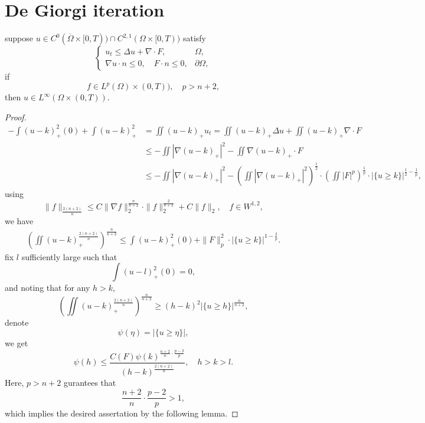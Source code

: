 \section{De Giorgi iteration}

\begin{lemma}
	suppose $u\in C^0(\overline{\Omega}\times[0,T))\cap C^{2,1}(\Omega\times[0,T))$ satisfy 
\begin{equation*}
	\begin{cases}
		u_t \leq \Delta u + \nabla\cdot F, & \Omega,\\
		\nabla u\cdot n \leq 0, \quad F\cdot n \leq 0, & \partial\Omega,
	\end{cases}
\end{equation*}
if 
\[
	f\in L^p(\Omega)\times(0,T)),\quad p>n+2,
\]
then
$u\in L^\infty(\Omega\times(0,T))$.
\end{lemma}

\begin{proof}
	\begin{align*}
		-\int(u-k)_+^2(0) + \int (u-k)_+^2
		&= \iint (u-k)_+u_t = \iint (u-k)_+\Delta u + \iint(u-k)_+\nabla\cdot F\\
		&\leq - \iint |\nabla(u-k)_+|^2 - \iint \nabla(u-k)_+\cdot F\\
		&\leq - \iint |\nabla(u-k)_+|^2 
			- \left(\iint |\nabla(u-k)_+|^2\right)^{\frac12}
			\cdot\left(\iint |F|^p\right)^{\frac1p}
			\cdot |\{u\geq k\}|^{\frac{1}{2}-\frac1p},
	\end{align*}
using 
\[
	\|f\|_{\frac{2(n+2)}{n}}\leq C\|\nabla f\|_2^{\frac{n}{n+2}}\cdot\|f\|_2^{\frac{2}{n+2}} 
		+ C\|f\|_2,	\quad f\in W^{1,2},
\]
we have
\begin{align*}
	\left(\iint (u-k)_+^{\frac{2(n+2)}{n}}\right)^{\frac{n}{n+2}}
	\leq \int(u-k)_+^2(0) + \|F\|_p^2\cdot|\{u\geq k\}|^{1-\frac2p}.
\end{align*}
fix $l$ sufficiently large such that 
\[
	\int (u-l)_+^2(0) = 0,
\]
and noting that for any $h>k$,
\[
	\left(\iint (u-k)_+^{\frac{2(n+2)}{n}}\right)^{\frac{n}{n+2}}
	\geq (h-k)^2|\{u\geq h\}|^{\frac{n}{n+2}},
\]
denote 
\[
	\psi(\eta) = |\{u\geq \eta\}|,
\]
we get
\[
	\psi(h) \leq \frac{C(F)\psi(k)^{\frac{n+2}{n}\cdot\frac{p-2}{p}}}{(h-k)^{\frac{2(n+2)}{n}}},
	\quad h>k>l.
\]
Here, $p>n+2$ gurantees that 
\[
	\frac{n+2}{n}\cdot\frac{p-2}{p} > 1,
\]
which implies the desired assertation by the following lemma.
\end{proof}

